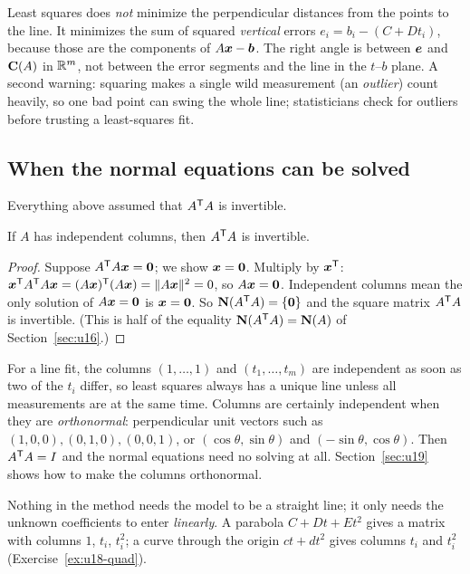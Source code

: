 \begin{trap}
Least squares does \emph{not} minimize the perpendicular distances from the points to the
line. It minimizes the sum of squared \emph{vertical} errors $e_i=b_i-(C+Dt_i)$, because those
are the components of $A\boldsymbol{x}-\boldsymbol{b}$. The right angle is between $\boldsymbol{e}$ and $\mathbf{C}(A)$ in
$\mathbb{R}^m$, not between the error segments and the line in the $t$--$b$ plane. A second warning:
squaring makes a single wild measurement (an \emph{outlier}) count heavily, so one bad point can
swing the whole line; statisticians check for outliers before trusting a least-squares fit.
\end{trap}

\subsection{When the normal equations can be solved}

Everything above assumed that $A^{\mathsf{T}} A$ is invertible.

\begin{theorem}\label{thm:u18-invertible}
If $A$ has independent columns, then $A^{\mathsf{T}} A$ is invertible.
\end{theorem}

\begin{proof}
Suppose $A^{\mathsf{T}} A\boldsymbol{x}=\boldsymbol{0}$; we show $\boldsymbol{x}=\boldsymbol{0}$. Multiply by $\boldsymbol{x}^{\mathsf{T}}$:
$\boldsymbol{x}^{\mathsf{T}} A^{\mathsf{T}} A\boldsymbol{x}=(A\boldsymbol{x})^{\mathsf{T}}(A\boldsymbol{x})=\|A\boldsymbol{x}\|^2=0$, so $A\boldsymbol{x}=\boldsymbol{0}$. Independent
columns mean the only solution of $A\boldsymbol{x}=\boldsymbol{0}$ is $\boldsymbol{x}=\boldsymbol{0}$. So $\mathbf{N}(A^{\mathsf{T}} A)=\{\boldsymbol{0}\}$
and the square matrix $A^{\mathsf{T}} A$ is invertible. (This is half of the equality
$\mathbf{N}(A^{\mathsf{T}} A)=\mathbf{N}(A)$ of Section~\ref{sec:u16}.)
\end{proof}

For a line fit, the columns $(1,\dots,1)$ and $(t_1,\dots,t_m)$ are independent as soon as two
of the $t_i$ differ, so least squares always has a unique line unless all measurements are at
the same time. Columns are certainly independent when they are \emph{orthonormal}:
perpendicular unit vectors such as $(1,0,0),(0,1,0),(0,0,1)$, or $(\cos\theta,\sin\theta)$ and
$(-\sin\theta,\cos\theta)$. Then $A^{\mathsf{T}} A=I$ and the normal equations need no solving at all.
Section~\ref{sec:u19} shows how to make the columns orthonormal.

Nothing in the method needs the model to be a straight line; it only needs the unknown
coefficients to enter \emph{linearly}. A parabola $C+Dt+Et^2$ gives a matrix with columns $1$,
$t_i$, $t_i^2$; a curve through the origin $ct+dt^2$ gives columns $t_i$ and $t_i^2$
(Exercise~\ref{ex:u18-quad}).

